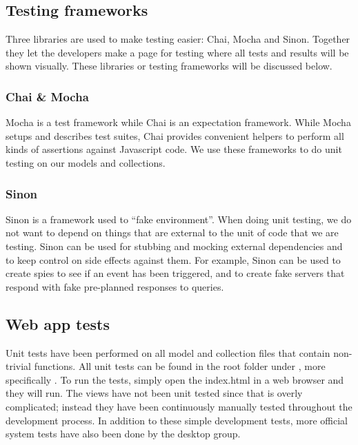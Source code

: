 \subsection{Testing frameworks}
Three libraries are used to make testing easier: Chai, Mocha and Sinon. Together they let the developers make a page for testing where all tests and results will be shown visually.
These libraries or testing frameworks will be discussed below.
\subsubsection{Chai \& Mocha}
Mocha\cite{web_8} is a test framework while Chai\cite{web_7} is an expectation framework. While Mocha setups and describes test suites, Chai provides convenient helpers to perform all kinds of assertions against Javascript code. We use these frameworks to do unit testing on our models and collections.

\subsubsection{Sinon}
Sinon\cite{web_9} is a framework used to “fake environment”. When doing unit testing, we do not want to depend on things that are external to the unit of code that we are testing. Sinon can be used for stubbing and mocking external dependencies and to keep control on side effects against them. For example, Sinon can be used to create spies to see if an event has been triggered, and to create fake servers that respond with fake pre-planned responses to queries.

\subsection{Web app tests}
Unit tests have been performed on all model and collection files that contain non-trivial functions. All unit tests can be found in the root folder under , more specifically . To run the tests, simply open the index.html in a web browser and they will run. The views have not been unit tested since that is overly complicated; instead they have been continuously manually tested throughout the development process. In addition to these simple development tests, more official system tests have also been done by the desktop group.
